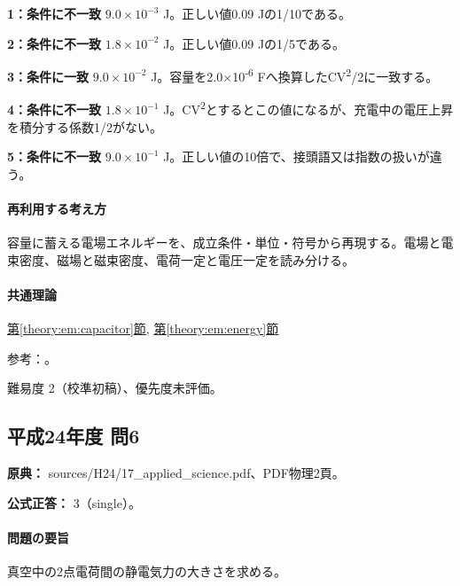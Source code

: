 \noindent\textbf{1：条件に不一致} \(9.0\times10^{-3}\) J。正しい値0.09 Jの1/10である。\par

\noindent\textbf{2：条件に不一致} \(1.8\times10^{-2}\) J。正しい値0.09 Jの1/5である。\par

\noindent\textbf{3：条件に一致} \(9.0\times10^{-2}\) J。容量を2.0×10\textsuperscript{-6} Fへ換算したCV\textsuperscript{2}/2に一致する。\par

\noindent\textbf{4：条件に不一致} \(1.8\times10^{-1}\) J。CV\textsuperscript{2}とするとこの値になるが、充電中の電圧上昇を積分する係数1/2がない。\par

\noindent\textbf{5：条件に不一致} \(9.0\times10^{-1}\) J。正しい値の10倍で、接頭語又は指数の扱いが違う。\par

\paragraph{再利用する考え方} 容量に蓄える電場エネルギーを、成立条件・単位・符号から再現する。電場と電束密度、磁場と磁束密度、電荷一定と電圧一定を読み分ける。

\paragraph{共通理論} \hyperref[theory:em:capacitor]{第\ref*{theory:em:capacitor}節}, \hyperref[theory:em:energy]{第\ref*{theory:em:energy}節}

\par 参考：\cite{mit_em05}。

\par 難易度 2（校準初稿）、優先度未評価。

\subsection{平成24年度 問6}
\label{q:h24-reg-applied-06}

\noindent\textbf{原典：} sources/H24/17\_applied\_science.pdf、PDF物理2頁。

\textbf{公式正答：} 3（single）。

\paragraph{問題の要旨} 真空中の2点電荷間の静電気力の大きさを求める。

